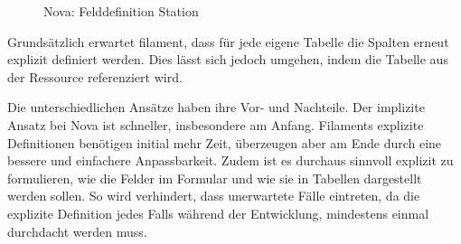 \begin{figure}[h!]
    \centering
    \caption{Nova: Felddefinition Station}
    \label{fig:station_fields_nova}
\end{figure}

Grundsätzlich erwartet filament, dass für jede eigene Tabelle die Spalten erneut explizit definiert werden.
Dies lässt sich jedoch umgehen, indem die Tabelle aus der Ressource referenziert wird.

Die unterschiedlichen Ansätze haben ihre Vor- und Nachteile.
Der implizite Ansatz bei Nova ist schneller, insbesondere am Anfang.
Filaments explizite Definitionen benötigen initial mehr Zeit, überzeugen aber am Ende durch eine bessere und einfachere Anpassbarkeit.
Zudem ist es durchaus sinnvoll explizit zu formulieren, wie die Felder im Formular und wie sie in Tabellen dargestellt werden sollen.
So wird verhindert, dass unerwartete Fälle eintreten, da die explizite Definition jedes Falls während der Entwicklung, mindestens einmal durchdacht werden muss.

